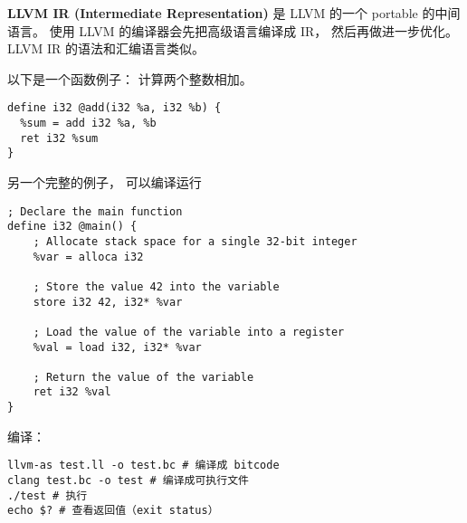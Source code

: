 
\begin{issues}
\issueDraft
\end{issues}


\textbf{LLVM IR (Intermediate Representation)} 是 LLVM 的一个 portable 的中间语言。 使用 LLVM 的编译器会先把高级语言编译成 IR， 然后再做进一步优化。 LLVM IR 的语法和汇编语言类似。

以下是一个函数例子： 计算两个整数相加。
\begin{lstlisting}[language=none]
define i32 @add(i32 %a, i32 %b) {
  %sum = add i32 %a, %b
  ret i32 %sum
}
\end{lstlisting}

另一个完整的例子， 可以编译运行
\begin{lstlisting}[language=none,caption=test.ll]
; Declare the main function
define i32 @main() {
    ; Allocate stack space for a single 32-bit integer
    %var = alloca i32

    ; Store the value 42 into the variable
    store i32 42, i32* %var

    ; Load the value of the variable into a register
    %val = load i32, i32* %var

    ; Return the value of the variable
    ret i32 %val
}
\end{lstlisting}

编译：
\begin{lstlisting}[language=none]
llvm-as test.ll -o test.bc # 编译成 bitcode
clang test.bc -o test # 编译成可执行文件
./test # 执行
echo $? # 查看返回值（exit status）
\end{lstlisting}
